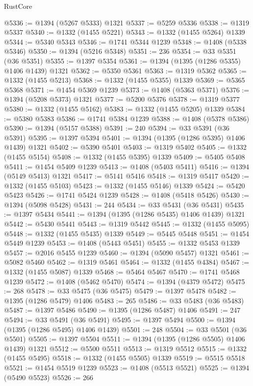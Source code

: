 \begin{lexlean}{RustCore}
\begin{coremodule}
@5336 := @1394 (@5267 @5333) @1321
@5337 := @5259 @5336
@5338 := @1319 @5337
@5340 := @1332 (@1455 @5221)
@5343 := @1332 (@1455 @5264) @1339
@5344 := @5340 @5343
@5346 := @1741 @5344 @1239
@5348 := @1408 (@5338 @5346)
@5350 := @1394 (@5216 @5348)
@5351 := 236
@5354 := @33 @5351 (@36 @5351)
@5355 := @1397 @5354
@5361 := @1394 (@1395 (@1286 @5355) @1406 @1439) @1321
@5362 := @5350 @5361
@5363 := @1319 @5362
@5365 := @1332 (@1455 @5213)
@5368 := @1332 (@1455 @5355) @1339
@5369 := @5365 @5368
@5371 := @1454 @5369 @1239
@5373 := @1408 (@5363 @5371)
@5376 := @1394 (@5208 @5373) @1321
@5377 := @5200 @5376
@5378 := @1319 @5377
@5380 := @1332 (@1455 @5162)
@5383 := @1332 (@1455 @5205) @1339
@5384 := @5380 @5383
@5386 := @1741 @5384 @1239
@5388 := @1408 (@5378 @5386)
@5390 := @1394 (@5157 @5388)
@5391 := 240
@5394 := @33 @5391 (@36 @5391)
@5395 := @1397 @5394
@5401 := @1394 (@1395 (@1286 @5395) @1406 @1439) @1321
@5402 := @5390 @5401
@5403 := @1319 @5402
@5405 := @1332 (@1455 @5154)
@5408 := @1332 (@1455 @5395) @1339
@5409 := @5405 @5408
@5411 := @1454 @5409 @1239
@5413 := @1408 (@5403 @5411)
@5416 := @1394 (@5149 @5413) @1321
@5417 := @5141 @5416
@5418 := @1319 @5417
@5420 := @1332 (@1455 @5103)
@5423 := @1332 (@1455 @5146) @1339
@5424 := @5420 @5423
@5426 := @1741 @5424 @1239
@5428 := @1408 (@5418 @5426)
@5430 := @1394 (@5098 @5428)
@5431 := 244
@5434 := @33 @5431 (@36 @5431)
@5435 := @1397 @5434
@5441 := @1394 (@1395 (@1286 @5435) @1406 @1439) @1321
@5442 := @5430 @5441
@5443 := @1319 @5442
@5445 := @1332 (@1455 @5095)
@5448 := @1332 (@1455 @5435) @1339
@5449 := @5445 @5448
@5451 := @1454 @5449 @1239
@5453 := @1408 (@5443 @5451)
@5455 := @1332 @5453 @1339
@5457 := @2016 @5455 @1239
@5460 := @1394 (@5090 @5457) @1321
@5461 := @5082 @5460
@5462 := @1319 @5461
@5464 := @1332 (@1455 @4384)
@5467 := @1332 (@1455 @5087) @1339
@5468 := @5464 @5467
@5470 := @1741 @5468 @1239
@5472 := @1408 (@5462 @5470)
@5474 := @1394 (@4379 @5472)
@5475 := 268
@5478 := @33 @5475 (@36 @5475)
@5479 := @1397 @5478
@5482 := @1395 (@1286 @5479) @1406
@5483 := 265
@5486 := @33 @5483 (@36 @5483)
@5487 := @1397 @5486
@5490 := @1395 (@1286 @5487) @1406
@5491 := 247
@5494 := @33 @5491 (@36 @5491)
@5495 := @1397 @5494
@5500 := @1394 (@1395 (@1286 @5495) @1406 @1439)
@5501 := 248
@5504 := @33 @5501 (@36 @5501)
@5505 := @1397 @5504
@5511 := @1394 (@1395 (@1286 @5505) @1406 @1439) @1321
@5512 := @5500 @5511
@5513 := @1319 @5512
@5515 := @1332 (@1455 @5495)
@5518 := @1332 (@1455 @5505) @1339
@5519 := @5515 @5518
@5521 := @1454 @5519 @1239
@5523 := @1408 (@5513 @5521)
@5525 := @1394 (@5490 @5523)
@5526 := 266

\end{coremodule}
\end{lexlean}
